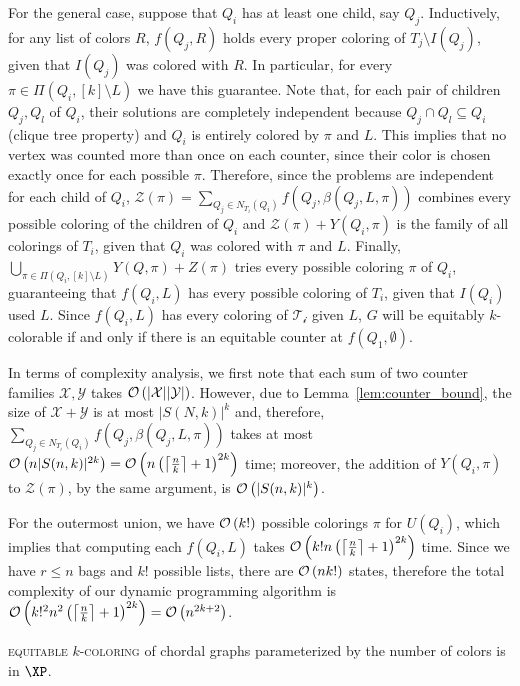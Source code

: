 \begin{tproof}
    For the general case, suppose that $Q_i$ has at least one child, say $Q_j$.
    Inductively, for any list of colors $R$, $f(Q_j, R)$ holds every proper coloring of $T_j \setminus I(Q_j)$, given that $I(Q_j)$ was colored with $R$.
    In particular, for every $\pi \in \Pi(Q_i, [k] \setminus L)$ we have this guarantee.
    Note that, for each pair of children $Q_j, Q_l$ of $Q_i$, their solutions are completely independent because $Q_j \cap Q_l \subseteq Q_i$ (clique tree property) and $Q_i$ is entirely colored by $\pi$ and $L$.
    This implies that no vertex was counted more than once on each counter, since their color is chosen exactly once for each possible $\pi$.
    Therefore, since the problems are independent for each child of $Q_i$, $\mathcal{Z}(\pi) = \sum_{Q_j \in N_{T_i}(Q_i)} f(Q_j, \beta(Q_j, L, \pi))$ combines every possible coloring of the children of $Q_i$ and $\mathcal{Z}(\pi) + Y(Q_i, \pi)$ is the family of all colorings of $T_i$, given that $Q_i$ was colored with $\pi$ and $L$.
    Finally, $\bigcup_{\pi \in \Pi(Q_i, [k] \setminus L)} Y(Q, \pi) + Z(\pi)$ tries every possible coloring $\pi$ of $Q_i$, guaranteeing that $f(Q_i, L)$ has every possible coloring of $T_i$, given that $I(Q_i)$ used $L$.
    Since $f(Q_i, L)$ has every coloring of $\mathcal{T_i}$ given $L$, $G$ will be equitably $k$-colorable if and only if there is an equitable counter at $f(Q_1, \emptyset)$.
    
    In terms of complexity analysis, we first note that each sum of two counter families $\mathcal{X},\mathcal{Y}$ takes $\mathcal{O}\left(|\mathcal{X}||\mathcal{Y}|\right)$.
    However, due to Lemma~\ref{lem:counter_bound}, the size of $\mathcal{X} + \mathcal{Y}$ is at most $|S(N,k)|^k$ and, therefore, $\sum_{Q_j \in N_{T_i}(Q_i)} f(Q_j, \beta(Q_j, L, \pi))$ takes at most $\mathcal{O}\left(n|S(n,k)|^{2k}\right) = \mathcal{O}\left(n \left(\left\lceil\frac{n}{k}\right\rceil + 1\right)^{2k}\right)$ time; moreover, the addition of $Y(Q_i, \pi)$ to $\mathcal{Z}(\pi)$, by the same argument, is $\mathcal{O}\left(|S(n,k)|^k\right)$.
    
    For the outermost union, we have $\mathcal{O}\left(k!\right)$ possible colorings $\pi$ for $U(Q_i)$, which implies that computing each $f(Q_i, L)$ takes $\mathcal{O}\left(k!n\left(\left\lceil\frac{n}{k}\right\rceil + 1\right)^{2k}\right)$ time.
    Since we have $r \leq n$ bags and $k!$ possible lists, there are $\mathcal{O}\left(nk!\right)$ states, therefore the total complexity of our dynamic programming algorithm is $\mathcal{O}\left(k!^2n^2\left(\left\lceil\frac{n}{k}\right\rceil + 1\right)^{2k}\right) = \mathcal{O}\left(n^{2k + 2}\right)$.
\end{tproof}

\begin{corollary}
    \textsc{equitable $k$-coloring} of chordal graphs parameterized by the number of colors is in $\XP$.
\end{corollary}


